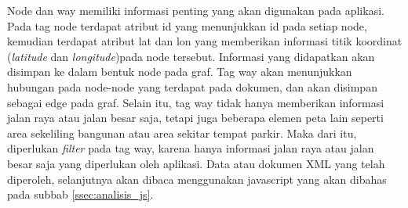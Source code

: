 Node dan way memiliki informasi penting yang akan digunakan pada aplikasi. Pada
tag node terdapat atribut id yang menunjukkan id pada setiap node, kemudian
terdapat atribut lat dan lon yang memberikan informasi titik koordinat
(\textit{latitude} dan \textit{longitude})pada node tersebut. Informasi yang
didapatkan akan disimpan ke dalam bentuk node pada graf. Tag way akan
menunjukkan hubungan pada node-node yang terdapat pada dokumen, dan akan
disimpan sebagai edge pada graf. Selain itu, tag way tidak hanya memberikan
informasi jalan raya atau jalan besar saja, tetapi juga beberapa elemen peta
lain seperti area sekeliling bangunan atau area sekitar tempat parkir. Maka dari
itu, diperlukan \textit{filter} pada tag way, karena hanya informasi jalan raya
atau jalan besar saja yang diperlukan oleh aplikasi. Data atau dokumen XML yang
telah diperoleh, selanjutnya akan dibaca menggunakan javascript yang akan
dibahas pada subbab \ref{ssec:analisis_js}.

